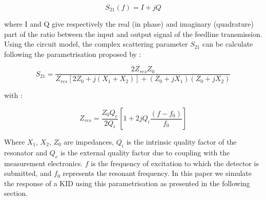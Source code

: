 \begin{equation}
S_{21}(f) = I +jQ
\end{equation}

where I and Q give respectively the real (in phase) and imaginary (quadrature) part of the ratio between the input and output signal of the feedline transmission. \\

Using the circuit model, the complex scattering parameter $S_{21}$ can be calculate following the parametrisation proposed by \citet{2008ApPhL..93m4102G} :

\begin{equation}
S_{21} = \frac{2Z_{res}Z_{0}}{Z_{res}[2Z_{0} + j(X_{1}+X_{2})] + (Z_{0} +jX_{1})(Z_{0} +jX_{2})}
\end{equation}

with :

\begin{equation}
Z_{res} = \frac{Z_{0}Q_{e}}{2Q_{i}}[1 + 2jQ_{i}\frac{(f-f_{0})}{f_{0}}]
\end{equation}

Where $X_{1}$, $X_{2}$, $Z_{0}$ are impedances, $Q_{i}$ is the intrinsic quality factor of the resonator and $Q_{e}$ is the external quality factor due to coupling with the measurement electronics. $f$ is the frequency of excitation to which the detector is submitted, and $f_{0}$ represents the resonant frequency. In this paper we simulate the response of a KID using this parametrisation as presented in the following section.


 


